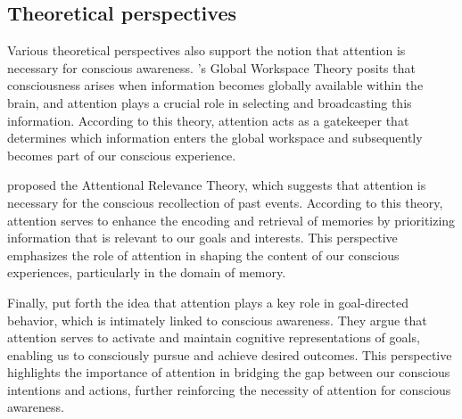 \documentclass[10pt]{article}
\begin{document}
\begin{sloppypar}
  \subsection{Theoretical perspectives}
  \label{sec:theoretical}

  Various theoretical perspectives also support the notion that attention is necessary for conscious awareness. \cite{baars_essential_1997}'s Global Workspace Theory posits that consciousness arises when information becomes globally available within the brain, and attention plays a crucial role in selecting and broadcasting this information. According to this theory, attention acts as a gatekeeper that determines which information enters the global workspace and subsequently becomes part of our conscious experience.

  \cite{de_brigard_role_2012} proposed the Attentional Relevance Theory, which suggests that attention is necessary for the conscious recollection of past events. According to this theory, attention serves to enhance the encoding and retrieval of memories by prioritizing information that is relevant to our goals and interests. This perspective emphasizes the role of attention in shaping the content of our conscious experiences, particularly in the domain of memory.

  Finally, \cite{dijksterhuis_goals_2010} put forth the idea that attention plays a key role in goal-directed behavior, which is intimately linked to conscious awareness. They argue that attention serves to activate and maintain cognitive representations of goals, enabling us to consciously pursue and achieve desired outcomes. This perspective highlights the importance of attention in bridging the gap between our conscious intentions and actions, further reinforcing the necessity of attention for conscious awareness.

  \pagebreak
  \singlespacing %
  
  

\end{sloppypar}
\end{document}
